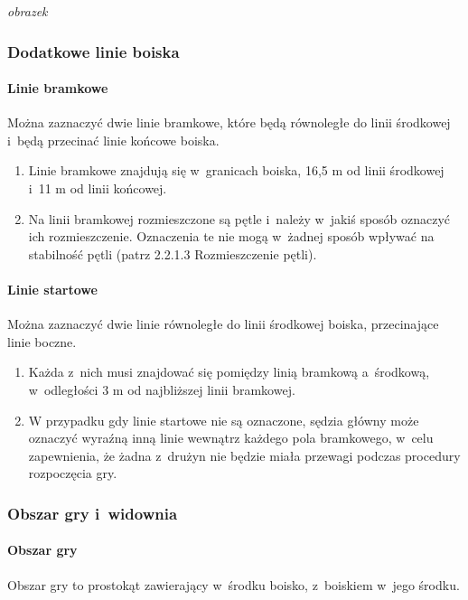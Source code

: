 \documentclass[12pt]{article}
\begin{document}
\textit{obrazek}

\subsubsection{Dodatkowe linie boiska}

\paragraph{Linie bramkowe}
Można zaznaczyć dwie linie
bramkowe, które będą równoległe do linii środkowej i~będą przecinać
linie końcowe boiska.

\begin{enumerate}
	\item Linie bramkowe znajdują się w~granicach boiska, 16,5 m od linii
	      środkowej i~11 m od linii końcowej.

	\item Na linii bramkowej rozmieszczone są pętle i~należy w~jakiś sposób
	      oznaczyć ich rozmieszczenie. Oznaczenia te nie mogą w~żadnej sposób
	      wpływać na stabilność pętli (patrz 2.2.1.3 Rozmieszczenie pętli).
\end{enumerate}

\paragraph{Linie startowe}
Można zaznaczyć dwie linie równoległe
do linii środkowej boiska, przecinające linie boczne.

\begin{enumerate}
	\item Każda z~nich musi znajdować się pomiędzy linią bramkową a~środkową, w~odległości 3 m od najbliższej linii bramkowej.
	\item W przypadku gdy linie startowe nie są oznaczone, sędzia główny może
	      oznaczyć wyraźną inną linie wewnątrz każdego pola bramkowego, w~celu
	      zapewnienia, że żadna z~drużyn nie będzie miała przewagi podczas
	      procedury rozpoczęcia gry.
\end{enumerate}

\subsubsection{Obszar gry i~widownia}

\paragraph{Obszar gry}
Obszar gry to prostokąt zawierający w~środku boisko, z~boiskiem w~jego środku.
\end{document}
